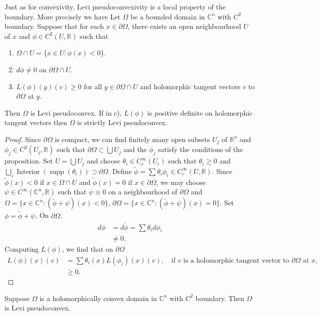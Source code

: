 Just as for convexivity, Levi pseudoconvexivity is a local property of the boundary. More precisely we have
 Let $\Omega$ be a bounded domain in $\mathbb C^n$ with $C^2$ boundary. Suppose that for each $x\in\partial\Omega$, there exists an open neighbourhood $U$ of $x$ and $\phi\in C^2(U,\mathbb R)$ such that
\begin{enumerate}
\item[a)] $\Omega\cap U=\{x\in U:\phi(x)<0\}$.
\item[b)] $d\phi\neq0$ on $\partial\Omega\cap U$.
\item[c)] $L(\phi)(y)(v)\geq0$ for all $y\in\partial\Omega\cap U$ and holomorphic tangent vectors $v$ to $\partial\Omega$ at $y$.
\end{enumerate}
Then $\Omega$ is Levi pseudoconvex. If in c), $L(\phi)$ is positive definite on holomorphic tangent vectors then $\Omega$ is strictly Levi pseudoconvex.
\begin{proof}
Since $\partial\Omega$ is compact, we can find finitely many open subsets $U_j$ of $\mathbb R^n$ and $\phi_j\in C^2(U_j,\mathbb R)$ such that $\partial\Omega\subset\bigcup U_j$ and the $\phi_j$ satisfy the conditions of the proposition. Set $U=\bigcup U_j$ and choose $\theta_i\in C_c^\infty(U_i)$ such that $\theta_i\geq0$ and $\bigcup_i\operatorname{Interior}(\operatorname{supp}(\theta_i))\supset\partial\Omega$. Define $\widetilde\phi=\sum\theta_i\phi_i\in C_c^\infty(U,\mathbb R)$. Since $\widetilde\phi(x)<0$ if $x\in\Omega\cap U$ and $\widetilde\phi(x)=0$ if $x\in\partial\Omega$, we may choose $\psi\in C^\infty(\mathbb C^n,\mathbb R)$ such that $\psi\equiv0$ on a neighbourhood of $\partial\Omega$ and $\Omega=\{x\in\mathbb C^n:(\widetilde\phi+\psi)(x)<0\}$, $\partial\Omega=\{x\in\mathbb C^n:(\widetilde\phi+\psi)(x)=0\}$. Set $\phi=\widetilde\phi+\psi$. On $\partial\Omega$,
\begin{align*}d\phi&=d\widetilde\phi=\sum\theta_i d\phi_i\\&\neq0.\end{align*}
Computing $L(\phi)$, we find that on $\partial\Omega$
\begin{align*}
L(\phi)(x)(v)&=\sum\theta_i(x)L(\phi_i)(x)(v),\quad\text{if }v\text{ is a holomorphic tangent vector to }\partial\Omega\text{ at }x,\\
&\geq0.
\end{align*}
\end{proof}
 Suppose $\Omega$ is a holomorphically convex domain in $\mathbb C^n$ with $C^2$ boundary. Then $\Omega$ is Levi pseudoconvex.
